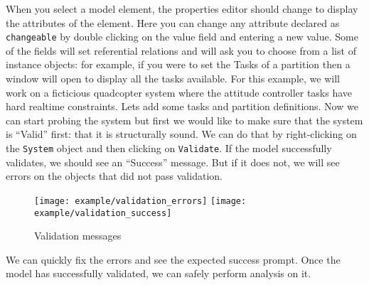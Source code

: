 When you select a model element, the properties editor should change to display
the attributes of the element. Here you can change any attribute declared
as \texttt{changeable} by double clicking on the value field and
entering a new value.
Some of the fields will set referential relations and will ask
you to choose from a list of instance objects: for example, if you
were to set the Tasks of a partition then a window will open to display
all the tasks available. For this example, we will work on a ficticious quadcopter system where
the attitude controller tasks have hard realtime constraints.
Lets add some tasks and partition definitions. 
Now we can start probing the system but first we would like to make sure that
the system is ``Valid'' first: that it is structurally sound. We can
do that by right-clicking on the \texttt{System} object and 
then clicking on \texttt{Validate}.
If the model successfully validates, we should see an ``Success''
message. But if it does not, we will see errors on the objects
that did not pass validation.
\begin{figure}[H]
    \centering
    \texttt{[image: example/validation\_errors]}
    \texttt{[image: example/validation\_success]}
    \caption{Validation messages}
\end{figure}
We can quickly fix the errors and see the expected success prompt.
Once the model has successfully validated, we can safely perform
analysis on it.
